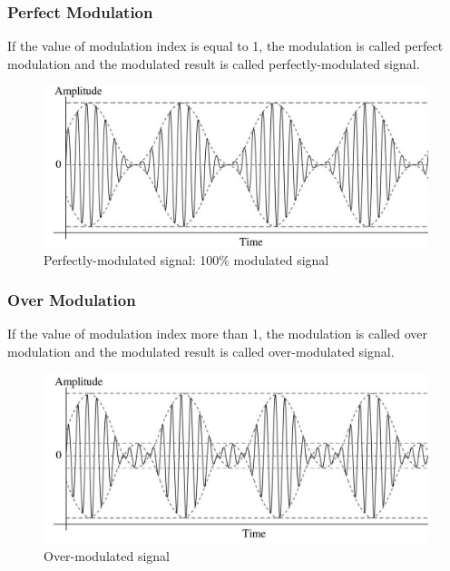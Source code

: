 \documentclass{lab_sheet}
\begin{document}
    \subsubsection{Perfect Modulation}
    If the value of modulation index is equal to 1, the modulation is called perfect modulation and the modulated result is called perfectly-modulated signal.
    \begin{figure}[H]
        \centering
        \includegraphics[width=.95\linewidth]{./Figures/perfect.png}
        \caption{Perfectly-modulated signal: 100\% modulated signal}
        \label{fig:perfect}
    \end{figure}
    \subsubsection{Over Modulation}
    If the value of modulation index more than 1, the modulation is called over modulation and the modulated result is called over-modulated signal.
    \begin{figure}[H]
        \centering
        \includegraphics[width=.95\linewidth]{./Figures/over.png}
        \caption{Over-modulated signal}
        \label{fig:over}
    \end{figure}
\end{document}
